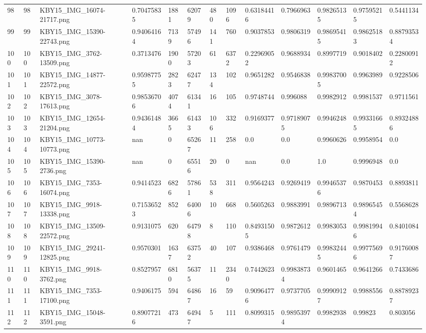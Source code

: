 \documentclass[11pt, a4paper, twoside]{report}
\begin{document}
\begin{longtable}[c]{@{}lllllllllllll@{}}
98 & 98 & KBY15\_IMG\_16074-21717.png & 0.70475835 & 1881 & 62079 & 480 & 1096 & 0.63184416 & 0.7966963 & 0.98265135 & 0.97595215 & 0.5441134 \\
99 & 99 & KBY15\_IMG\_15390-22743.png & 0.94064164 & 7139 & 57496 & 141 & 760 & 0.9037853 & 0.9806319 & 0.98695415 & 0.98625183 & 0.88793534 \\
100 & 100 & KBY15\_IMG\_3762-13509.png & 0.3713476 & 1900 & 57203 & 61 & 6372 & 0.22969052 & 0.9688934 & 0.8997719 & 0.9018402 & 0.22800912 \\
101 & 101 & KBY15\_IMG\_14877-22572.png & 0.95987755 & 2823 & 62477 & 134 & 102 & 0.9651282 & 0.9546838 & 0.99837005 & 0.9963989 & 0.9228506 \\
102 & 102 & KBY15\_IMG\_3078-17613.png & 0.98536706 & 4074 & 61341 & 16 & 105 & 0.9748744 & 0.996088 & 0.9982912 & 0.9981537 & 0.9711561 \\
103 & 103 & KBY15\_IMG\_12654-21204.png & 0.94361484 & 3665 & 61433 & 106 & 332 & 0.9169377 & 0.97189075 & 0.9946248 & 0.99331665 & 0.89324886 \\
104 & 104 & KBY15\_IMG\_10773-10773.png & nan & 0 & 65267 & 11 & 258 & 0.0 & 0.0 & 0.9960626 & 0.9958954 & 0.0 \\
105 & 105 & KBY15\_IMG\_15390-2736.png & nan & 0 & 65516 & 20 & 0 & nan & 0.0 & 1.0 & 0.9996948 & 0.0 \\
106 & 106 & KBY15\_IMG\_7353-16074.png & 0.9414523 & 6826 & 57861 & 538 & 311 & 0.9564243 & 0.9269419 & 0.99465376 & 0.9870453 & 0.8893811 \\
107 & 107 & KBY15\_IMG\_9918-13338.png & 0.71536523 & 852 & 64006 & 10 & 668 & 0.5605263 & 0.9883991 & 0.9896713 & 0.98965454 & 0.5568628 \\
108 & 108 & KBY15\_IMG\_13509-22572.png & 0.9131075 & 620 & 64798 & 8 & 110 & 0.84931505 & 0.9872612 & 0.9983053 & 0.99819946 & 0.8401084 \\
109 & 109 & KBY15\_IMG\_29241-12825.png & 0.9570301 & 1637 & 63752 & 40 & 107 & 0.9386468 & 0.9761479 & 0.99832445 & 0.99775696 & 0.91760087 \\
110 & 110 & KBY15\_IMG\_9918-3762.png & 0.8527957 & 6810 & 56375 & 11 & 2340 & 0.7442623 & 0.99838734 & 0.9601465 & 0.9641266 & 0.7433686 \\
111 & 111 & KBY15\_IMG\_7353-17100.png & 0.9406175 & 594 & 64867 & 16 & 59 & 0.90964776 & 0.9737705 & 0.99909127 & 0.9988556 & 0.88789237 \\
112 & 112 & KBY15\_IMG\_15048-3591.png & 0.89077216 & 473 & 64947 & 5 & 111 & 0.8099315 & 0.98953974 & 0.9982938 & 0.99823 & 0.803056 \\

\end{longtable}
\end{document}
